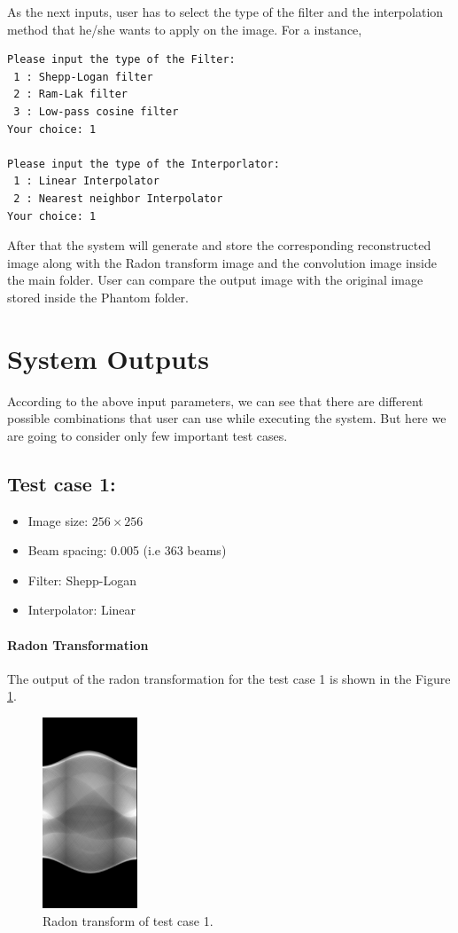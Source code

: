 As the next inputs, user has to select the type of the filter and the interpolation method that he/she wants to apply on the image. For a instance, 
\begin{verbatim}
Please input the type of the Filter: 
 1 : Shepp-Logan filter
 2 : Ram-Lak filter 
 3 : Low-pass cosine filter 
Your choice: 1
 
Please input the type of the Interporlator: 
 1 : Linear Interpolator
 2 : Nearest neighbor Interpolator 
Your choice: 1
\end{verbatim}

After that the system will generate and store the corresponding reconstructed image along with the Radon transform image and the convolution image inside the main folder. User can compare the output image with the original image stored inside the Phantom folder.   

\section{System Outputs}
According to the above input parameters, we can see that there are different possible combinations that user can use while executing the system. But here we are going to consider only few important test cases. 

\subsection{Test case 1:}
\begin{itemize}
\item Image size: $256 \times 256$
\item Beam spacing: 0.005 (i.e 363 beams)
\item Filter: Shepp-Logan
\item Interpolator:  Linear 
\end{itemize}

\paragraph{Radon Transformation}
The output of the radon transformation for the test case 1 is shown in the Figure \ref{fig:radont1}.  
\begin{figure}[H]
	\centering
		\includegraphics[width=80pt]{Figures/RadonTransform256.jpg}
	\caption[Radon transform of test case 1.]{Radon transform of test case 1.}
	\label{fig:radont1}
\end{figure}

